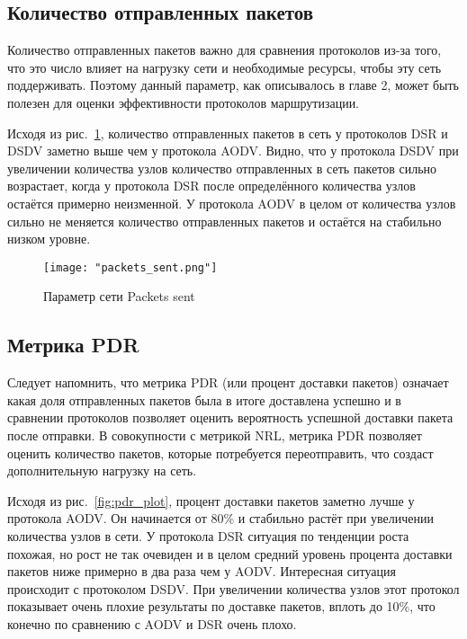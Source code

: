 \subsection{Количество отправленных пакетов}

Количество отправленных пакетов важно для сравнения протоколов из-за того, что это число влияет на нагрузку сети и необходимые ресурсы, чтобы эту сеть поддерживать. Поэтому данный параметр, как описывалось в главе 2, может быть полезен для оценки эффективности протоколов маршрутизации.

Исходя из рис.~\ref{fig:packets_sent_plot}, количество отправленных пакетов в сеть у протоколов DSR и DSDV заметно выше чем у протокола AODV. Видно, что у протокола DSDV при увеличении количества узлов количество отправленных в сеть пакетов сильно возрастает, когда у протокола DSR после определённого количества узлов остаётся примерно неизменной. У протокола AODV в целом от количества узлов сильно не меняется количество отправленных пакетов и остаётся на стабильно низком уровне.

\begin{figure}[!h]
    \centering
    \texttt{[image: "packets\_sent.png"]}
    \caption{Параметр сети Packets sent}
    \label{fig:packets_sent_plot}
\end{figure}

\subsection{Метрика PDR}

Следует напомнить, что метрика PDR (или процент доставки пакетов) означает какая доля отправленных пакетов была в итоге доставлена успешно и в сравнении протоколов позволяет оценить вероятность успешной доставки пакета после отправки. В совокупности с метрикой NRL, метрика PDR позволяет оценить количество пакетов, которые потребуется переотправить, что создаст дополнительную нагрузку на сеть.

Исходя из рис.~\ref{fig:pdr_plot}, процент доставки пакетов заметно лучше у протокола AODV. Он начинается от 80\% и стабильно растёт при увеличении количества узлов в сети. У протокола DSR ситуация по тенденции роста похожая, но рост не так очевиден и в целом средний уровень процента доставки пакетов ниже примерно в два раза чем у AODV. Интересная ситуация происходит с протоколом DSDV. При увеличении количества узлов этот протокол показывает очень плохие результаты по доставке пакетов, вплоть до  10\%, что конечно по сравнению с AODV и DSR очень плохо. 
  

